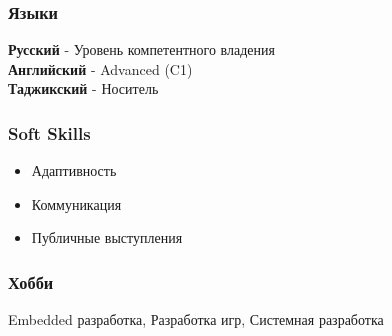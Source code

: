 \documentclass[a4paper,10pt]{article}
\begin{document}
\subsubsection*{Языки}
\textbf{Русский} - Уровень компетентного владения \\
\textbf{Английский} - Advanced (C1) \\
\textbf{Таджикский} - Носитель
\subsubsection*{Soft Skills}
\begin{itemize}
    \item Адаптивность
    \item Коммуникация
    \item Публичные выступления
\end{itemize}
\subsubsection*{Хобби}
Embedded разработка, Разработка игр, Системная разработка
\end{document}
